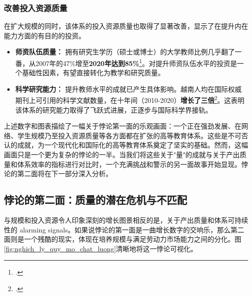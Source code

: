\subsubsection{改善投入资源质量}
在扩大规模的同时，该体系的投入资源质量也取得了显著改善，显示了在提升内在能力方面的有目的的投资。
\begin{itemize}
    \item \textbf{师资队伍质量：} 拥有研究生学历（硕士或博士）的大学教师比例几乎翻了一番，从2007年的47\%增至\textbf{2020年达到85\%}\footcite{worldbank_p178112}。对提升师资队伍水平的投资是一个基础性因素，有望直接转化为教学和研究质量。
    \item \textbf{科学研究能力：} 提升教师水平的成就已产生具体影响。越南人均在国际权威期刊上可引用的科学文献数量，在十年间（2010-2020）\textbf{增长了三倍}\footcite{worldbank_improvingperformance_2020}。这表明该体系的研究能力取得了飞跃式进展，正逐步与国际科学界接轨。
\end{itemize}

上述数字和图表描绘了一幅关于悖论第一面的乐观画面：一个正在强劲发展、在网络、学生规模乃至投入资源质量等各方面都在扩张的高等教育体系。这些是不可否认的成就，为一个现代化和国际化的高等教育体系奠定了坚实的基础。然而，这幅画面只是一个更为复杂的悖论的一半。当我们将这些关于"量"的成就与关于产出质量和体系效率的指标进行对比时，一个充满挑战和警示的另一面故事开始显现。悖论的第二面将在下一部分深入分析。





\subsection{悖论的第二面：质量的潜在危机与不匹配}
\label{subsec:ve_thu_hai_nghich_ly}

与规模和投入资源令人印象深刻的增长图景相反的是，关于产出质量和体系可持续性的 alarming signals。如果说悖论的第一面是一曲增长数字的交响乐，那么第二面则是一个残酷的现实，体现在培养规模与满足劳动力市场能力之间的分化。图\ref{fig:nghich_ly_quy_mo_chat_luong}清晰地将这一悖论可视化。

